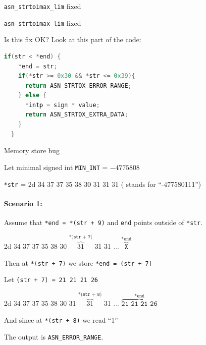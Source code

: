 \documentclass[10pt]{beamer}
\begin{document}
\begin{frame}{\texttt{asn\_strtoimax\_lim} fixed}
  
    {\fontsize{4}{1}\selectfont }

\end{frame}
  
  \begin{frame}[fragile]{\texttt{asn\_strtoimax\_lim} fixed}

    Is this fix OK? Look at this part of the code: 

     \begin{lstlisting}[language=C]
  if(str < *end) {
    *end = str;
    if(*str >= 0x30 && *str <= 0x39){
      return ASN_STRTOX_ERROR_RANGE;
    } else {
      *intp = sign * value;
      return ASN_STRTOX_EXTRA_DATA;
    }
  }
  \end{lstlisting}
  
\end{frame}

\begin{frame}{Memory store bug}

    Let minimal signed int \texttt{MIN\_INT} = $-4775808$ 

    \texttt{*str} = {\color{red}2d 34 37 37 35 38 30 31 31 31} ( stands for ``-477580111'') 

    \paragraph{{\bf Scenario 1}:}

    Assume that \texttt{*end = *(str + 9)} and  \texttt{end} points outside of \texttt{*str}.

     {\color{red}2d 34 37 37 35 38 30 {\color{blue}$\overbrace{31}^{\texttt{*(str + 7)}}$} 31 31 $\ldots$ $\overbrace{\texttt{X}}^{\texttt{*end}}$}

     Then at \texttt{*(str + 7)} we store \texttt{*end = (str + 7)}

     Let \texttt{(str + 7) = 21 21 21 26} 

     {\color{red}2d 34 37 37 35 38 30 31 {\color{blue} $\overbrace{31}^{\texttt{*(str + 8)}}$} 31  $\ldots$ $\overbrace{\texttt{21 21 21 26}}^{\texttt{*end}}$}
     
     And since at \texttt{*(str + 8)} we read ``1''
     

     
     The output is  \texttt{ASN\_ERROR\_RANGE}.


  \end{frame}
\end{document}
